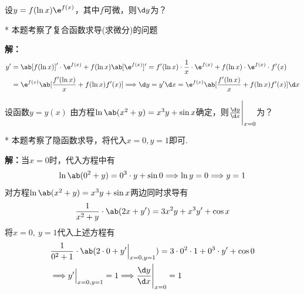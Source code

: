 \begin{problem}
    设$y=f(\ln x)\e^{f(x)}$，其中$f$可微，则$\d y$为？
\end{problem}
\begin{draft}
    \vspace{5em}
\end{draft}
\begin{solution}*
    本题考察了复合函数求导(求微分)的问题

    \textbf{解：}
    \[\begin{aligned}
        y'&=\ab[f(\ln x)] '\cdot \e^{f(x)}+f(\ln x)\ab[\e^{f(x)} ]'=f'(\ln x)\cdot \frac{1}{x}\cdot \e^{f(x)}+f(\ln x)\cdot \e^{f(x)}\cdot f'(x)\\
        &=\e^{f(x)}\ab[\frac{f'(\ln x)}{x}+f(\ln x)f'(x) ]\Longrightarrow\d y=y'\d x=\e^{f(x)}\ab[\frac{f'(\ln x)}{x}+f(\ln x)f'(x) ] \d x
    \end{aligned}\]
\end{solution}

\begin{problem}
    设函数$y=y(x)$ 由方程$\ln\ab(x^2+y )=x^3y+\sin x$确定，则$\frac{\d y}{\d x}\Bigg|_{x=0}$为？
\end{problem}
\begin{draft}
    \vspace{5em}
\end{draft}
\begin{solution}*
    本题考察了隐函数求导，将代入$x=0,y=1$即可.

    \textbf{解：}当$x=0$时，代入方程中有
    \[\ln\ab(0^2+y )=0^3\cdot y+\sin 0\Longrightarrow \ln y=0\Longrightarrow y=1\]
    对方程$\ln\ab(x^2+y )=x^3y+\sin x$两边同时求导有
    \[\frac{1}{x^2+y}\cdot\ab(2x+y' )=3x^2y+x^3y'+\cos x\]
    将$x=0,\ y=1$代入上述方程有
    \[\begin{aligned}
        &\frac{1}{0^2+1}\cdot\ab(2\cdot 0+y'\Big|_{x=0,y=1}^{} )=3\cdot 0^2\cdot 1+0^3\cdot y'+\cos 0\\
        &\Longrightarrow y'\Big|_{x=0,y=1}^{}=1\Longrightarrow \frac{\d y}{\d x}\Bigg|_{x=0}^{}=1
    \end{aligned}\]
\end{solution}


